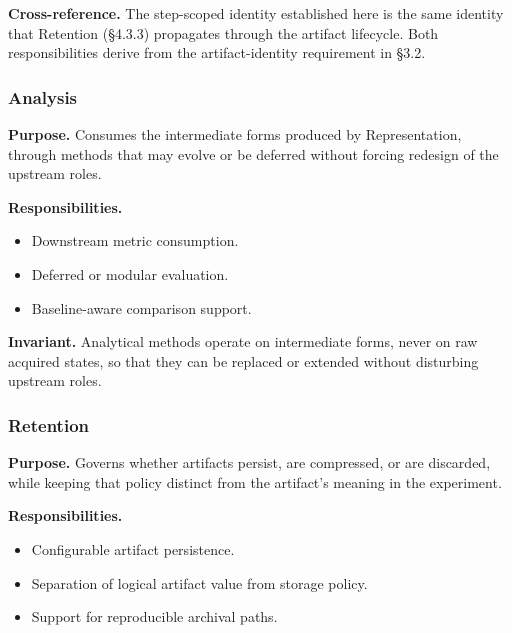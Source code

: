   \textbf{Cross-reference.} The step-scoped identity established here is the same identity that Retention (\S4.3.3) propagates through the artifact lifecycle. Both responsibilities derive from the artifact-identity requirement in \S3.2.

  \subsubsection{Analysis}
  \textbf{Purpose.} Consumes the intermediate forms produced by Representation, through methods that may evolve or be deferred without forcing redesign of the upstream roles.

  \textbf{Responsibilities.}
  \begin{itemize}
    \item Downstream metric consumption.
    \item Deferred or modular evaluation.
    \item Baseline-aware comparison support.
  \end{itemize}

  \textbf{Invariant.} Analytical methods operate on intermediate forms, never on raw acquired states, so that they can be replaced or extended without disturbing upstream roles.

  \subsubsection{Retention}
  \textbf{Purpose.} Governs whether artifacts persist, are compressed, or are discarded, while keeping that policy distinct from the artifact's meaning in the experiment.

  \textbf{Responsibilities.}
  \begin{itemize}
    \item Configurable artifact persistence.
    \item Separation of logical artifact value from storage policy.
    \item Support for reproducible archival paths.
  \end{itemize}

